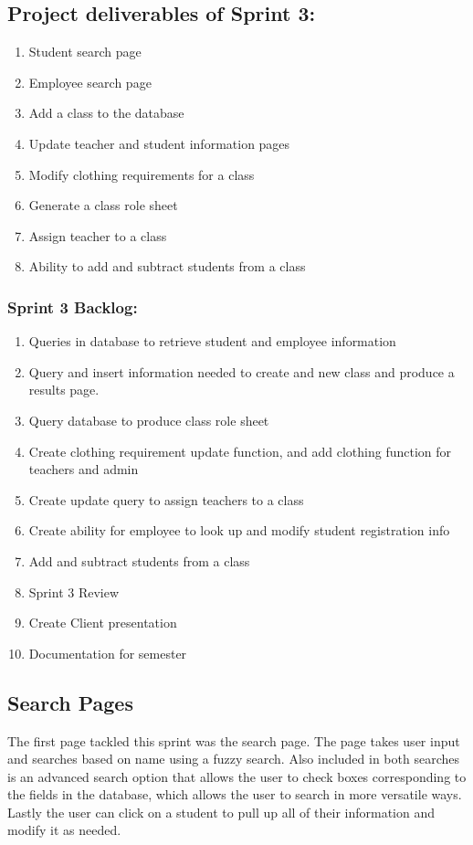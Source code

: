 \subsection{Project deliverables of Sprint 3:}

\begin{enumerate}
\item Student search page 
\item Employee search page
\item Add a class to the database
\item Update teacher and student information pages
\item Modify clothing requirements for a class
\item Generate a class role sheet
\item Assign teacher to a class
\item Ability to add and subtract students from a class  
\end{enumerate}


\subsubsection{Sprint 3 Backlog:}

\begin{enumerate}
\item Queries in database to retrieve student and employee information
\item Query and insert information needed to create and new class and produce a results page.
\item Query database to produce class role sheet
\item Create clothing requirement update function, and add clothing function for teachers and admin
\item Create update query to assign teachers to a class
\item Create ability for employee to look up and modify student registration info
\item Add and subtract students from a class
\item Sprint 3 Review
\item Create Client presentation
\item Documentation for semester
\end{enumerate}

\subsection{Search Pages}
The first page tackled this sprint was the search page. The page takes user input and searches based on name using a fuzzy search. Also included in both searches is an advanced search option that allows the user to check boxes corresponding to the fields in the database, which allows the user to search in more versatile ways. Lastly the user can click on a student to pull up all of their information and modify it as needed.


